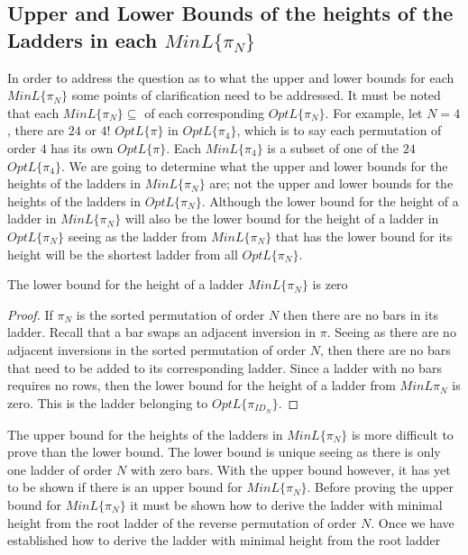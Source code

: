 \subsection{Upper and Lower Bounds of the heights of the Ladders in each $MinL\{\pi_{N}\}$}
In order to address the question as to what the upper and lower bounds for each $MinL\{\pi_{N}\}$ 
some points of clarification need to be addressed. It must be noted that each $MinL\{\pi_{N}\} \subseteq$ of each
corresponding $OptL\{\pi_{N}\}$. For example, let $N=4$, there are $24$ or $4!$ $OptL\{\pi\}$ in $OptL\{\pi_{4}\}$, which is to say 
each permutation of order $4$ has its own $OptL\{\pi\}$. Each $MinL\{\pi_{4}\}$ is a subset of one of the $24$
$OptL\{\pi_{4}\}$. We are going to determine what the upper and lower bounds for the heights of the ladders in $MinL\{\pi_{N}\}$ are;
not the upper and lower bounds for the heights of the ladders in $OptL\{\pi_{N}\}$. Although the lower bound for the 
height of a ladder in $MinL\{\pi_{N}\}$ will also be the lower bound for the height of a ladder in $OptL\{\pi_{N}\}$
seeing as the ladder from $MinL\{\pi_{N}\}$ that has the lower bound for its height will be the shortest ladder 
from all $OptL\{\pi_{N}\}$.
\begin{lemma}
    The lower bound for the height of a ladder $MinL\{\pi_{N}\}$ is zero
\end{lemma} 
\begin{proof}
    If $\pi_{N}$ is the sorted permutation of order $N$ then there are no 
    bars in its ladder. Recall that a bar swaps an adjacent inversion in $\pi$.
    Seeing as there are no adjacent inversions in the sorted permutation of 
    order $N$, then there are no bars that need to be added to its corresponding 
    ladder. Since a ladder with no bars requires no rows, then the lower 
    bound for the height of a ladder from $MinL{\pi_{N}}$ is zero. This is 
    the ladder belonging to $OptL\{\pi_{ID_{N}}\}$.
\end{proof}\par 
The upper bound for the heights of the ladders in $MinL\{\pi_{N}\}$ is more difficult to prove than the lower bound. 
The lower bound is unique seeing as there is only one ladder of order $N$ with zero bars. 
With the upper bound however, it has yet to be shown if there is an upper bound for 
$MinL\{\pi_{N}\}$. Before proving the upper bound for $MinL\{\pi_{N}\}$ it must be shown how to 
derive the ladder with minimal height from the root ladder of the reverse permutation of order $N$.
Once we have established how to derive the ladder with minimal height from the root ladder 
